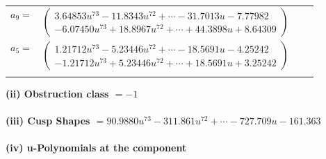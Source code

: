 \documentclass[1p]{elsarticle_modified}
\theoremstyle{definition}
\begin{document}
\begin{tabular}{m{7pt} m{180pt} m{7pt} m{180pt} }
\flushright $a_{9}=$&$\begin{pmatrix}3.64853 u^{73}-11.8343 u^{72}+\cdots-31.7013 u-7.77982\\-6.07450 u^{73}+18.8967 u^{72}+\cdots+44.3898 u+8.64309\end{pmatrix}$ \\
\flushright $a_{5}=$&$\begin{pmatrix}1.21712 u^{73}-5.23446 u^{72}+\cdots-18.5691 u-4.25242\\-1.21712 u^{73}+5.23446 u^{72}+\cdots+18.5691 u+3.25242\end{pmatrix}$\\&\end{tabular}
\flushleft \textbf{(ii) Obstruction class $= -1$}\\~\\
\flushleft \textbf{(iii) Cusp Shapes $= 90.9880 u^{73}-311.861 u^{72}+\cdots-727.709 u-161.363$}\\~\\
\newpage\renewcommand{\arraystretch}{1}
\flushleft \textbf{(iv) u-Polynomials at the component}\newline \\
\end{document}
